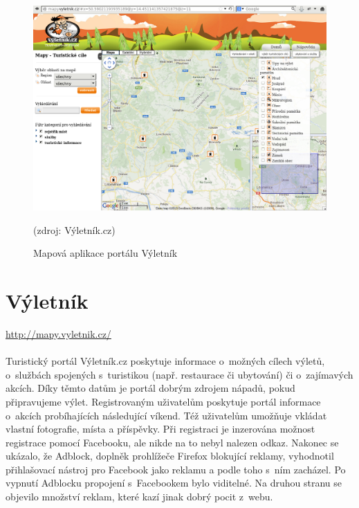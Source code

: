 \documentclass[11pt,a4paper,titlepage,oneside]{book}
\begin{document}
		\begin{figure}[!h]
			\begin{center}
				\includegraphics[width=12cm]{obrazky/vyletnik.png}
				\caption{Mapová aplikace portálu Výletník}
				(zdroj: Výletník.cz\cite{vyletnikMapa})
			\end{center}
		\end{figure}

	\section{Výletník}
		\label{sec:vyletnik}
		\url{http://mapy.vyletnik.cz/}
		\paragraph{} Turistický portál Výletník.cz poskytuje informace o~možných cílech výletů, o~službách spojených s~turistikou (např. restaurace či ubytování)  či o~zají\-mavých akcích. Díky těmto datům je portál dobrým zdrojem nápadů, pokud připravujeme výlet. Registrovaným uživatelům poskytuje portál informace o~akcích probíhajících následující víkend. Též uživatelům umožňuje vkládat vlastní fotografie, místa a příspěvky. Při registraci je inzerována možnost registrace pomocí Facebooku, ale nikde na to nebyl nalezen odkaz. Nakonec se ukázalo, že Adblock, doplněk prohlížeče Firefox blokující reklamy, vyhodnotil přihlašovací nástroj pro Facebook jako reklamu a podle toho s~ním zacházel. Po vypnutí Adblocku propojení s~Facebookem bylo viditelné. Na druhou stranu se objevilo množství reklam, které kazí jinak dobrý pocit z~webu.
\end{document}
